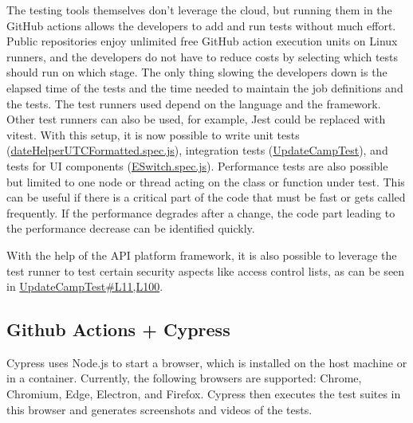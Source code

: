 \documentclass[conference]{IEEEtran}
\begin{document}
The testing tools themselves don't leverage the cloud, but running them in the GitHub actions allows the developers to
add and run tests without much effort.
Public repositories enjoy unlimited free GitHub action execution units on Linux runners\cite{github-actions-pricing},
and the developers do not have to reduce costs by selecting which tests should run on which stage.
The only thing slowing the developers down is the elapsed time of the tests and the time needed to maintain the job definitions and the tests.
The test runners used depend on the language and the framework.
Other test runners can also be used, for example, Jest\cite{jest-website} could be replaced with vitest\cite{vitest-website}.
\newline
With this setup, it is now possible to write unit tests (\href{https://github.com/ecamp/ecamp3/blob/7a1cf92e3eee27b0b942fcd87bd8ce5c221089b7/common/helpers/__tests__/dateHelperUTCFormatted.spec.js}{dateHelperUTCFormatted.spec.js}),
integration tests (\href{https://github.com/ecamp/ecamp3/blob/7a1cf92e3eee27b0b942fcd87bd8ce5c221089b7/api/tests/Api/Camps/UpdateCampTest.php}{UpdateCampTest}),
and tests for UI components (\href{https://github.com/ecamp/ecamp3/blob/7a1cf92e3eee27b0b942fcd87bd8ce5c221089b7/frontend/src/components/form/base/__tests__/ESwitch.spec.js}{ESwitch.spec.js}).
Performance tests are also possible but limited to one node or thread acting on the class or function under test.
This can be useful if there is a critical part of the code that must be fast or gets called frequently.
If the performance degrades after a change, the code part leading to the performance decrease can be identified quickly.

With the help of the API platform framework, it is also possible to leverage the test runner to test certain security
aspects like access control lists, as can be seen in \href{https://github.com/ecamp/ecamp3/blob/7a1cf92e3eee27b0b942fcd87bd8ce5c221089b7/api/tests/Api/Camps/UpdateCampTest.php#L11,L100}{UpdateCampTest\#L11,L100}.

\subsection{Github Actions + Cypress}
Cypress uses Node.js to start a browser, which is installed on the host machine or in a container.
Currently, the following browsers are supported: Chrome, Chromium, Edge, Electron, and Firefox\cite{cypress-website-supported-browsers}.
Cypress then executes the test suites in this browser and generates screenshots and videos of the tests.
\end{document}
